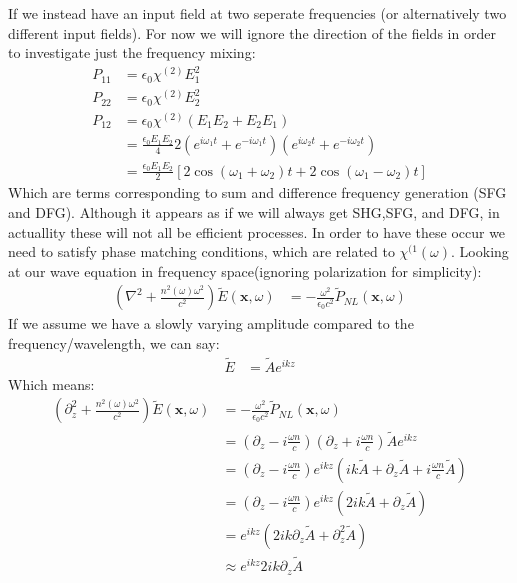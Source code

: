 If we instead have an input field at two seperate frequencies (or alternatively two different input fields). For now we will ignore the direction of the fields in order to investigate just the frequency mixing:
\begin{align*}
	P_{11} &= \epsilon_0 \chi^{(2)}E_1^2 \\
	P_{22} &= \epsilon_0 \chi^{(2)}E_2^2 \\
	P_{12} &= \epsilon_0 \chi^{(2)} (E_1E_2 + E_2E_1) \\
	&= \frac{\epsilon_0 E_1 E_2}{4} 2(e^{i\omega_1 t} + e^{-i\omega_1 t})(e^{i\omega_2 t} + e^{-i\omega_2 t}) \\
	&= \frac{\epsilon_0 E_1 E_2}{2} \left[ 2\cos (\omega_1 +\omega_2)t + 2\cos (\omega_1 -\omega_2)t\right]
\end{align*}
Which are terms corresponding to sum and difference frequency generation (SFG and DFG). Although it appears as if we will always get SHG,SFG, and DFG, in actuallity these will not all be efficient processes.
In order to have these occur we need to satisfy phase matching conditions, which are related to $\chi^{(1}(\omega)$. Looking at our wave equation in frequency space(ignoring polarization for simplicity):
\begin{align*}
	\left(\nabla^2 + \frac{n^2(\omega)\omega^2}{c^2}\right) \tilde{E}(\bm{x},\omega) &= -\frac{\omega^2}{\epsilon_0 c^2} \tilde{P}_{NL}(\bm{x},\omega)
\end{align*}
If we assume we have a slowly varying amplitude compared to the frequency/wavelength, we can say:
\begin{align*}
	\tilde{E} &= \tilde{A}e^{ikz}
\end{align*}
Which means:
\begin{align*}
	\left(\partial_z^2 + \frac{n^2(\omega)\omega^2}{c^2}\right) \tilde{E}(\bm{x},\omega) &= -\frac{\omega^2}{\epsilon_0 c^2} \tilde{P}_{NL}(\bm{x},\omega) \\
	&= \left(\partial_z - i\frac{\omega n}{c}\right)\left(\partial_z + i\frac{\omega n}{c}\right) \tilde{A} e^{ikz} \\
	&= \left(\partial_z - i\frac{\omega n}{c}\right)e^{ikz}\left(ik\tilde{A} + \partial_z \tilde{A} + i\frac{\omega n}{c}\tilde{A}\right) \\
	&= \left(\partial_z - i\frac{\omega n}{c}\right)e^{ikz}\left(2ik\tilde{A} + \partial_z \tilde{A}\right) \\
	&= e^{ikz}\left(2ik\partial_z \tilde{A} + \partial_z^2\tilde{A}\right) \\
	&\approx e^{ikz}2ik\partial_z \tilde{A}
\end{align*}
